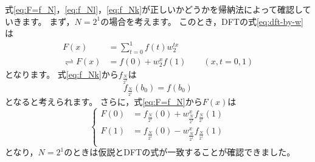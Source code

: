 \documentclass[uplatex, 11pt, a4j, dvipdfmx]{jsarticle}
\begin{document}
    式\eqref{eq:F=f_N}，\eqref{eq:f_Nl}，\eqref{eq:f_Nk}が正しいかどうかを帰納法によって確認していきます。
    まず，$N=2^1$の場合を考えます。
    このとき，DFTの式\eqref{eq:dft-by-w}は
    \begin{align}
        F(x) &= \sum_{t=0}^{1} f(t) w^{tx}_{2} \\
        \rightleftharpoons
        F(x) &= f(0) + w^{x}_{2} f(1) \qquad (x, t = 0,1)
    \end{align}
    となります。
    式\eqref{eq:f_Nk}から$f_{\frac{N}{2^1}}$は
    \begin{equation}
        f_{\frac{N}{2^1}}(b_0) = f(b_0)
    \end{equation}
    となると考えられます。
    さらに，式\eqref{eq:F=f_N}から$F(x)$は
    \begin{equation}
        \left\{ \begin{aligned}
            F(0) &= f_{\frac{N}{2^{1}}}(0) + w^x_{\frac{N}{2^1}} f_{\frac{N}{2^{1}}}(1) \\
            F(1) &= f_{\frac{N}{2^{1}}}(0) - w^x_{\frac{N}{2^1}} f_{\frac{N}{2^{1}}}(1) \\
        \end{aligned} \right.
    \end{equation}
    となり，$N=2^1$のときは仮説とDFTの式が一致することが確認できました。
\end{document}
